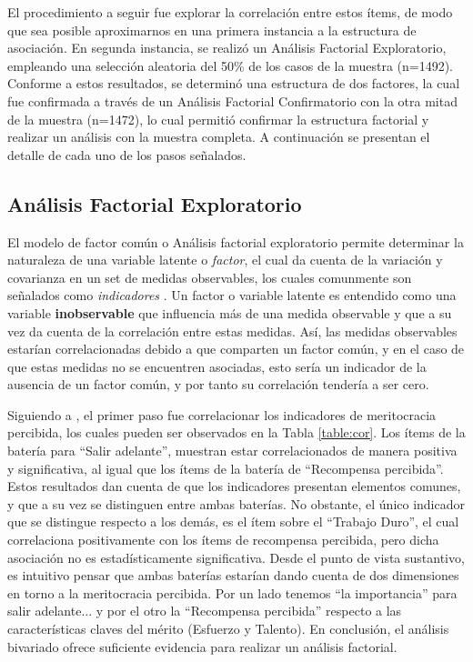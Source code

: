 \documentclass[12pt]{article}
\begin{document}
El procedimiento a seguir fue explorar la correlación entre estos ítems, de modo que sea posible aproximarnos en una primera instancia a la estructura de asociación. En segunda instancia, se realizó un Análisis Factorial Exploratorio, empleando una selección aleatoria del 50\% de los casos de la muestra (n=1492). Conforme a estos resultados, se determinó una estructura de dos factores, la cual fue confirmada a través de un Análisis Factorial Confirmatorio con la otra mitad de la muestra (n=1472), lo cual permitió confirmar la estructura factorial y realizar un análisis con la muestra completa. A continuación se presentan el detalle de cada uno de los pasos señalados.

\subsection*{Análisis Factorial Exploratorio}
		
El modelo de factor común o Análisis factorial exploratorio permite determinar la naturaleza de una variable latente o \textit{factor}, el cual da cuenta de la variación y covarianza en un set de medidas observables, los cuales comunmente son señalados como \textit{indicadores} \citep{Brown2008}. Un factor o variable latente es entendido como una variable \textbf{inobservable} que influencia más de una medida observable y que a su vez da cuenta de la correlación entre estas medidas. Así, las medidas observables estarían correlacionadas debido a que comparten un factor común, y en el caso de que estas medidas no se encuentren asociadas, esto sería un indicador de la ausencia de un factor común, y por tanto su correlación tendería a ser cero. 
	    
Siguiendo a \citet{Brown2008}, el primer paso fue correlacionar los indicadores de meritocracia percibida, los cuales pueden ser observados en la Tabla \ref{table:cor}. Los ítems de la batería para ``Salir adelante'', muestran estar correlacionados de manera positiva y significativa, al igual que los ítems de la batería de ``Recompensa percibida''. Estos resultados dan cuenta de que los indicadores presentan elementos comunes, y que a su vez se distinguen entre ambas baterías. No obstante, el único indicador que se distingue respecto a los demás, es el ítem sobre el ``Trabajo Duro'', el cual correlaciona positivamente con los ítems de recompensa percibida, pero dicha asociación no es estadísticamente significativa. Desde el punto de vista sustantivo, es intuitivo pensar que ambas baterías estarían dando cuenta de dos dimensiones en torno a la meritocracia percibida. Por un lado tenemos ``la importancia'' para salir adelante... y por el otro la ``Recompensa percibida'' respecto a las características claves del mérito (Esfuerzo y Talento). En conclusión, el análisis bivariado ofrece suficiente evidencia para realizar un análisis factorial.          
\end{document}
